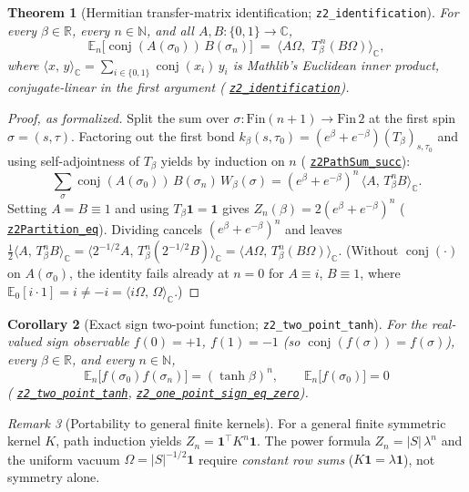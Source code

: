 \documentclass[11pt]{article}
\newtheorem{theorem}{Theorem}[section]
\newtheorem{corollary}[theorem]{Corollary}
\theoremstyle{remark}
\newtheorem{remark}[theorem]{Remark}
\theoremstyle{definition}
\newcommand{\lean}[1]{\texttt{#1}}
\newcommand{\anchor}{6b54eca695e96b3038ceda18276c4e28fb45983f}
\newcommand{\osline}[3]{%
  \href{https://github.com/lluiseriksson/THE-ERIKSSON-PROGRAMME/blob/\anchor/YangMills/OS/#1.lean\#L#2}{\nolinkurl{#3}}}
\newcommand{\R}{\mathbb{R}}
\newcommand{\C}{\mathbb{C}}
\newcommand{\Om}{\Omega}
\newcommand{\inn}[2]{\langle #1,\, #2\rangle_{\C}}
\newcommand{\Ex}{\mathbb{E}}
\newcommand{\conj}[1]{\operatorname{conj}(#1)}
\begin{document}
\begin{theorem}[Hermitian transfer-matrix identification; \lean{z2\_identification}]\label{thm:ident}
For every $\beta \in \R$, every $n \in \mathbb{N}$, and all $A, B : \{0,1\} \to \C$,
\[
  \Ex_n\bigl[\conj{A(\sigma_0)}\,B(\sigma_n)\bigr]
  \;=\; \inn{A\Om}{\,T_\beta^{\,n}(B\Om)},
\]
where $\inn{x}{y} = \sum_{i\in\{0,1\}} \conj{x_i}\,y_i$ is Mathlib's Euclidean inner
product, conjugate-linear in the first argument (\osline{Z2Identification}{269}{z2\_identification}).
\end{theorem}

\begin{proof}[Proof, as formalized]
Split the sum over $\sigma : \mathrm{Fin}(n+1) \to \mathrm{Fin}\,2$ at the first spin
$\sigma = (s,\tau)$. Factoring out the first bond
$k_\beta(s,\tau_0) = (e^\beta+e^{-\beta})(T_\beta)_{s,\tau_0}$ and using self-adjointness of
$T_\beta$ yields by induction on $n$ (\osline{Z2Identification}{171}{z2PathSum\_succ}):
\[
  \sum_{\sigma} \conj{A(\sigma_0)}\,B(\sigma_n)\,W_\beta(\sigma)
  = (e^\beta + e^{-\beta})^n\,\inn{A}{T_\beta^n B}.
\]
Setting $A = B \equiv 1$ and using $T_\beta\mathbf{1} = \mathbf{1}$ gives
$Z_n(\beta) = 2(e^\beta + e^{-\beta})^n$ (\osline{Z2Identification}{221}{z2Partition\_eq}).
Dividing cancels $(e^\beta+e^{-\beta})^n$ and leaves
$\tfrac{1}{2}\inn{A}{T_\beta^n B} = \inn{2^{-1/2}A}{T_\beta^n(2^{-1/2}B)} = \inn{A\Om}{T_\beta^n(B\Om)}$.
(Without $\conj{\cdot}$ on $A(\sigma_0)$, the identity fails already at $n=0$ for
$A \equiv i$, $B \equiv 1$, where $\Ex_0[i\cdot 1] = i \neq -i = \inn{i\Om}{\Om}$.)
\end{proof}

\begin{corollary}[Exact sign two-point function; \lean{z2\_two\_point\_tanh}]\label{thm:endpoint}
For the real-valued sign observable $f(0) = +1$, $f(1) = -1$ (so $\conj{f(\sigma)} = f(\sigma)$),
every $\beta \in \R$, and every $n \in \mathbb{N}$,
\[
  \Ex_n\bigl[f(\sigma_0)f(\sigma_n)\bigr] = (\tanh\beta)^n,
  \qquad
  \Ex_n\bigl[f(\sigma_0)\bigr] = 0
\]
(\osline{Z2Identification}{346}{z2\_two\_point\_tanh},
\osline{Z2Identification}{352}{z2\_one\_point\_sign\_eq\_zero}).
\end{corollary}

\begin{remark}[Portability to general finite kernels]
For a general finite symmetric kernel $K$, path induction yields $Z_n = \mathbf{1}^\top K^n \mathbf{1}$.
The power formula $Z_n = |S|\,\lambda^n$ and the uniform vacuum $\Om = |S|^{-1/2}\mathbf{1}$
require \emph{constant row sums} ($K\mathbf{1} = \lambda\mathbf{1}$), not symmetry alone.
\end{remark}
\end{document}

